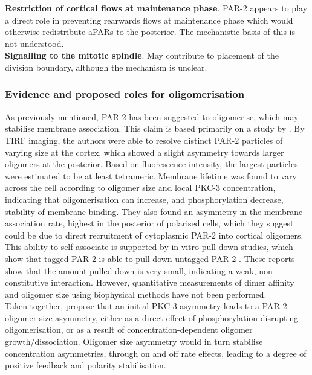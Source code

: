 \documentclass[12pt]{"article"}
\begin{document}
\textbf{Restriction of cortical flows at maintenance phase}. PAR-2 appears to play a direct role in preventing rearwards flows at maintenance phase which would otherwise redistribute aPARs to the posterior. The mechanistic basis of this is not understood.\\

\textbf{Signalling to the mitotic spindle}. May contribute to placement of the division boundary, although the mechanism is unclear.\\


\subsubsection{Evidence and proposed roles for oligomerisation}

As previously mentioned, PAR-2 has been suggested to oligomerise, which may stabilise membrane association. This claim is based primarily on a study by \textcite{Arata2016}. By TIRF imaging, the authors were able to resolve distinct PAR-2 particles of varying size at the cortex, which showed a slight asymmetry towards larger oligomers at the posterior. Based on fluorescence intensity, the largest particles were estimated to be at least tetrameric. Membrane lifetime was found to vary across the cell according to oligomer size and local PKC-3 concentration, indicating that oligomerisation can increase, and phosphorylation decrease, stability of membrane binding. They also found an asymmetry in the membrane association rate, highest in the posterior of polarised cells, which they suggest could be due to direct recruitment of cytoplasmic PAR-2 into cortical oligomers.\\

This ability to self-associate is supported by in vitro pull-down studies, which show that tagged PAR-2 is able to pull down untagged PAR-2 \citep{Motegi2011}\citep{Arata2016}. These reports show that the amount pulled down is very small, indicating a weak, non-constitutive interaction. However, quantitative measurements of dimer affinity and oligomer size using biophysical methods have not been performed.\\

Taken together, \textcite{Arata2016} propose that an initial PKC-3 asymmetry leads to a PAR-2 oligomer size asymmetry, either as a direct effect of phosphorylation disrupting oligomerisation, or as a result of concentration-dependent oligomer growth/dissociation. Oligomer size asymmetry would in turn stabilise concentration asymmetries, through on and off rate effects, leading to a degree of positive feedback and polarity stabilisation.\\
\end{document}
